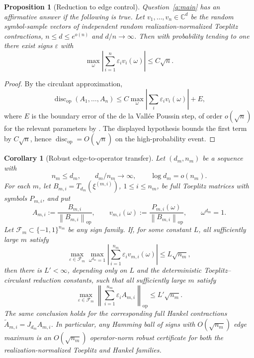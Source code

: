 \documentclass[11pt]{amsart}
\numberwithin{equation}{section}
\newtheorem{proposition}[theorem]{Proposition}
\newtheorem{corollary}[theorem]{Corollary}
\theoremstyle{definition}
\theoremstyle{remark}
\newcommand{\C}{\mathbb C}
\newcommand{\op}{\mathrm{op}}
\newcommand{\discop}{\operatorname{disc}_{\op}}
\newcommand{\norm}[1]{\left\lVert #1\right\rVert}
\newcommand{\abs}[1]{\left\lvert #1\right\rvert}
\newcommand{\eps}{\varepsilon}
\begin{document}
\begin{proposition}[Reduction to edge control]\label{prop:reduction}
Question~\ref{q:main} has an affirmative answer if the following is true. Let
$v_1,\ldots,v_n\in\C^d$ be the random symbol-sample vectors of independent random
realization-normalized Toeplitz contractions, \(n\le d\le e^{o(n)}\) and
\(d/n\to\infty\). Then with probability tending to one there exist signs
\(\eps\) with
\[
\max_{\omega}\abs{\sum_{i=1}^n\eps_iv_i(\omega)}\le C\sqrt n .
\]
\end{proposition}

\begin{proof}
By the circulant approximation,
\[
  \discop(A_1,\ldots,A_n)
  \le C\max_\omega\abs{\sum_i\eps_iv_i(\omega)}+E,
\]
where \(E\) is the boundary error of the de la Vall\'ee Poussin step, of order
\(o(\sqrt n)\) for the relevant parameters by
\cite[Rem.~5.12]{Shmalo-paper12}. The displayed hypothesis bounds the first
term by \(C\sqrt n\), hence \(\discop=O(\sqrt n)\) on the high-probability event.
\end{proof}

\begin{corollary}[Robust edge-to-operator transfer]
\label{cor:edge-to-operator-robust}
Let \((d_m,n_m)\) be a sequence with
\[
  n_m\le d_m,\qquad d_m/n_m\to\infty,\qquad \log d_m=o(n_m).
\]
For each \(m\), let \(B_{m,i}=T_{d_m}(\xi^{(m,i)})\),
\(1\le i\le n_m\), be full Toeplitz matrices with symbols \(P_{m,i}\), and put
\[
  A_{m,i}:=\frac{B_{m,i}}{\norm{B_{m,i}}_{\op}},
  \qquad
  v_{m,i}(\omega):=\frac{P_{m,i}(\omega)}{\norm{B_{m,i}}_{\op}},
  \qquad \omega^{d_m}=1.
\]
Let \(\mathcal F_m\subset\{-1,1\}^{n_m}\) be any sign family.  If, for some
constant \(L\), all sufficiently large \(m\) satisfy
\[
  \max_{\eps\in\mathcal F_m}\max_{\omega^{d_m}=1}
  \left|\sum_{i=1}^{n_m}\eps_i v_{m,i}(\omega)\right|
  \le L\sqrt{n_m},
\]
then there is \(L'<\infty\), depending only on \(L\) and the deterministic
Toeplitz--circulant reduction constants, such that all sufficiently large \(m\)
satisfy
\[
  \max_{\eps\in\mathcal F_m}
  \left\|\sum_{i=1}^{n_m}\eps_iA_{m,i}\right\|_{\op}
  \le L'\sqrt{n_m}.
\]
The same conclusion holds for the corresponding full Hankel contractions
\(\widetilde A_{m,i}=J_{d_m}A_{m,i}\).  In particular, any Hamming ball of
signs with \(O(\sqrt{n_m})\) edge maximum is an \(O(\sqrt{n_m})\)
operator-norm robust certificate for both the realization-normalized Toeplitz
and Hankel families.
\end{corollary}
\end{document}
